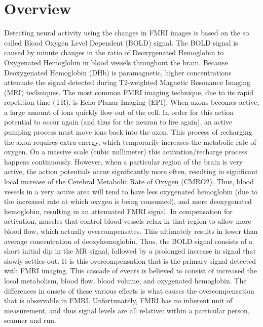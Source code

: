 \section{Overview}
\label{sec:Introduction Overview}
Detecting neural activity using the changes in FMRI images is based on 
the so called Blood Oxygen Level Dependent (BOLD) signal.
The BOLD signal is caused by minute changes in the ratio of Deoxygenated
Hemoglobin to Oxygenated Hemoglobin in blood vessels throughout the brain.
Because Deoxygenated Hemoglobin (DHb) is paramagnetic, higher concentrations
attenuate the signal detected during T2-weighted Magnetic Resonance Imaging (MRI)
techniques. The most common FMRI imaging technique, due to its rapid repetition 
time (TR), is Echo Planar Imaging (EPI). When axons becomes active,
a large amount of ions quickly flow out of the cell. In order for this
action potential to occur again (and thus for the neuron to fire again),
an active pumping process must move ions back into the
axon. This process of recharging the axon requires extra energy, which temporarily
increases the metabolic rate of oxygen. On a massive scale (cubic millimeter) 
this activation/recharge process happens continuously. However, when a 
particular region of the brain is very active, the action potentials
occur significantly more often, resulting in significant local increase
of the 
Cerebral Metabolic Rate of Oxygen (CMRO2). Thus, blood vessels in a very 
active area will 
tend to have less oxygenated hemoglobin (due to the increased rate at which
oxygen is being consumed), and more deoxygenated hemoglobin,
resulting in an attenuated FMRI signal. In compensation for 
activation, muscles that
control blood vessels relax in that region to allow more blood flow,
which actually overcompensates.
This ultimately results in lower than average concentration of 
deoxyhemoglobin. Thus, the BOLD signal consists of a short initial
dip in the MR signal, followed by a prolonged increase in signal
that slowly settles out. It is this overcompensation that is the 
primary signal detected with FMRI imaging. This cascade of events
is believed to consist of increased the local metabolism, 
blood flow, blood volume, and oxygenated hemoglobin. The differences
in onsets of these various effects is what causes the overcompensation
that is observable in FMRI. Unfortunately, FMRI has no inherent unit
of measurement, and thus signal levels are all relative: within a particular
person, scanner and run. 

